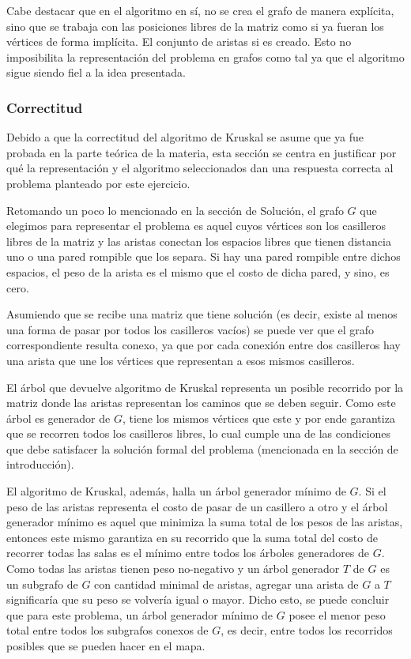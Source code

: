Cabe destacar que en el algoritmo en sí, no se crea el grafo de manera explícita, sino que se trabaja con las posiciones libres de la matriz como si ya fueran los vértices de forma implícita. El conjunto de aristas si es creado. Esto no imposibilita la representación del problema en grafos como tal ya que el algoritmo sigue siendo fiel a la idea presentada.

\subsubsection{Correctitud}

Debido a que la correctitud del algoritmo de Kruskal se asume que ya fue probada en la parte teórica de la materia, esta sección se centra en justificar por qué la representación y el algoritmo seleccionados dan una respuesta correcta al problema planteado por este ejercicio.

Retomando un poco lo mencionado en la sección de Solución, el grafo $G$ que elegimos para representar el problema es aquel cuyos vértices son los casilleros libres de la matriz y las aristas conectan los espacios libres que tienen distancia uno o una pared rompible que los separa. Si hay una pared rompible entre dichos espacios, el peso de la arista es el mismo que el costo de dicha pared, y sino, es cero.

Asumiendo que se recibe una matriz que tiene solución (es decir, existe al menos una forma de pasar por todos los casilleros vacíos) se puede ver que el grafo correspondiente resulta conexo, ya que por cada conexión entre dos casilleros hay una arista que une los vértices que representan a esos mismos casilleros.

El árbol que devuelve algoritmo de Kruskal representa un posible recorrido por la matriz donde las aristas representan los caminos que se deben seguir. Como este árbol es generador de $G$, tiene los mismos vértices que este y por ende garantiza que se recorren todos los casilleros libres, lo cual cumple una de las condiciones que debe satisfacer la solución formal del problema (mencionada en la sección de introducción).

El algoritmo de Kruskal, además, halla un árbol generador mínimo de $G$. Si el peso de las aristas representa el costo de pasar de un casillero a otro y el árbol generador mínimo es aquel que minimiza la suma total de los pesos de las aristas, entonces este mismo garantiza en su recorrido que la suma total del costo de recorrer todas las salas es el mínimo entre todos los árboles generadores de $G$. Como todas las aristas tienen peso no-negativo y un árbol generador $T$ de $G$ es un subgrafo de $G$ con cantidad minimal de aristas, agregar una arista de $G$ a $T$ significaría que su peso se volvería igual o mayor. Dicho esto, se puede concluir que para este problema, un árbol generador mínimo de $G$ posee el menor peso total entre todos los subgrafos conexos de $G$, es decir, entre todos los recorridos posibles que se pueden hacer en el mapa.

